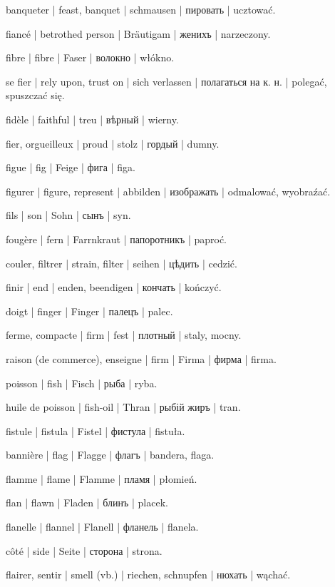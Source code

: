 \begin{outdent}{1em}
banqueter | feast, banquet | schmausen | пировать | ucztować.

fiancé | betrothed person | Bräutigam | женихъ | narzeczony.

fibre | fibre | Faser | волокно | włókno.

se fier | rely upon, trust on | sich verlassen | полагаться на
к. н. | polegać, spuszczać się.

fidèle | faithful | treu | вѣрный | wierny.

fier, orgueilleux | proud | stolz | гордый | dumny.

figue | fig | Feige | фига | figa.

figurer | figure, represent | abbilden | изображать | odmalować, wyobraźać.

fils | son | Sohn | сынъ | syn.

fougère | fern | Farrnkraut | папоротникъ | paproć.

couler, filtrer | strain, filter | seihen | цѣдить | cedzić.

finir | end | enden, beendigen | кончать | kończyć.

doigt | finger | Finger | палецъ | palec.

ferme, compacte | firm | fest | плотный | staly, mocny.

\uvsubentry{}
raison (de commerce), enseigne | firm | Firma | фирма | firma.

poisson | fish | Fisch | рыба | ryba.

\uvsubentry{}
huile de poisson | fish-oil | Thran | рыбій жиръ | tran.

fistule | fistula | Fistel | фистула | fistuła.

bannière | flag | Flagge | флагъ | bandera, flaga.

flamme | flame | Flamme | пламя | płomień.

flan | flawn | Fladen | блинъ | placek.

flanelle | flannel | Flanell | фланель | flanela.

côté | side | Seite | сторона | strona.

flairer, sentir | smell (vb.) | riechen, schnupfen | нюхать | wąchać.


\end{outdent}
